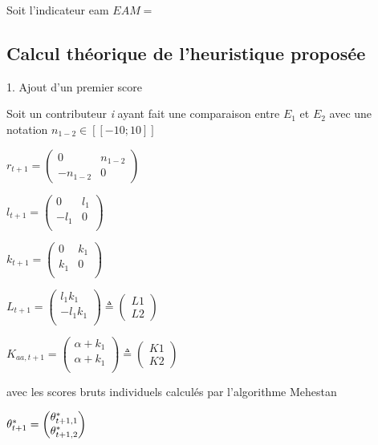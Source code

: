 Soit l'indicateur \gls{eam}
$EAM=$


\subsection{Calcul théorique de l'heuristique proposée}

1. Ajout d'un premier score 

Soit un contributeur \textit{i} ayant fait une comparaison entre $E_{1}$ et $E_{2}$ avec une notation $n_{1-2} \in [\![-10;10]\!]$

$r_{t+1}= \begin{pmatrix}
0 & n_{1-2} \\
-n_{1-2} & 0 
\end{pmatrix}$

$l_{t+1}= \begin{pmatrix}
0 & l_1 \\
-l_1 & 0 \\
\end{pmatrix}
$

$k_{t+1}= \begin{pmatrix}
0 & k_1 \\
k_1 & 0 \\
\end{pmatrix}
$


$L_{t+1}= \begin{pmatrix}
l_1 k_1\\
-l_1 k_1 \\
\end{pmatrix} \triangleq
\begin{pmatrix}
L1\\
L2
\end{pmatrix} 
$

$K_{aa,t+1}= \begin{pmatrix}
\alpha + k_1\\
\alpha +  k_1\\
\end{pmatrix} \triangleq
\begin{pmatrix}
K1\\
K2
\end{pmatrix} 
$

avec les scores bruts individuels calculés par l'algorithme Mehestan

$\theta^*_{t+1}= \begin{pmatrix}
\theta^*_{t+1,1} \\
\theta^*_{t+1,2} 
\end{pmatrix}$

